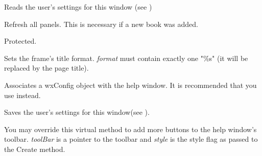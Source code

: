 \label{wxhtmlhelpwindowreadcustomization}


Reads the user's settings for this window (see )

\label{wxhtmlhelpwindowrefreshlists}


Refresh all panels. This is necessary if a new book was added.

Protected.

\label{wxhtmlhelpwindowsettitleformat}


Sets the frame's title format. {\it format} must contain exactly one "\%s"
(it will be replaced by the page title).

\label{wxhtmlhelpwindowuseconfig}


Associates a wxConfig object with the help window. It is recommended that you use  instead.

\label{wxhtmlhelpwindowwritecustomization}


Saves the user's settings for this window(see ).

\label{wxhtmlhelpwindowaddtoolbarbuttons}


You may override this virtual method to add more buttons to the help window's
toolbar. {\it toolBar} is a pointer to the toolbar and {\it style} is the style
flag as passed to the Create method.


